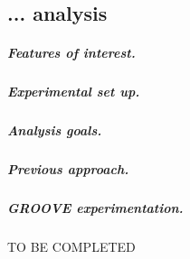 
\subsection{... analysis}

\subparagraph*{Features of interest.}

\subparagraph*{Experimental set up.}

\subparagraph*{Analysis goals.}

\subparagraph*{Previous approach.}

\subparagraph*{GROOVE experimentation.}
TO BE COMPLETED

